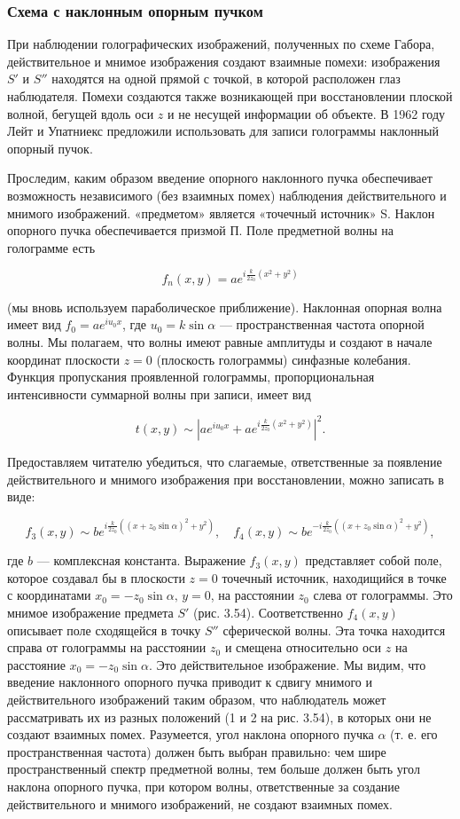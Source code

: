 \documentclass[a4paper,12pt]{article}
\begin{document}
\subsubsection{Схема с наклонным опорным пучком}

При наблюдении голографических изображений, полученных по схеме Габора, действительное и мнимое изображения создают взаимные помехи: изображения \( S' \) и \( S'' \) находятся на одной прямой с точкой, в которой расположен глаз наблюдателя. Помехи создаются также возникающей при восстановлении плоской волной, бегущей вдоль оси \( z \) и не несущей информации об объекте. В 1962 году Лейт и Упатниекс предложили использовать для записи голограммы наклонный опорный пучок.

Проследим, каким образом введение опорного наклонного пучка обеспечивает возможность независимого (без взаимных помех) наблюдения действительного и мнимого изображений. «предметом» является «точечный источник» S. Наклон опорного пучка обеспечивается призмой П. Поле предметной волны на голограмме есть

\[ f_n(x,y) = ae^{i\frac{k}{2z_0}(x^2+y^2)} \]

(мы вновь используем параболическое приближение). Наклонная опорная волна имеет вид \( f_0 = ae^{iu_0 x} \), где \( u_0 = k \sin \alpha \) — пространственная частота опорной волны. Мы полагаем, что волны имеют равные амплитуды и создают в начале координат плоскости \( z = 0 \) (плоскость голограммы) синфазные колебания. Функция пропускания проявленной голограммы, пропорциональная интенсивности суммарной волны при записи, имеет вид

\[ t(x,y) \sim \left| ae^{iu_0 x} + ae^{i\frac{k}{2z_0}(x^2+y^2)} \right|^2. \]

Предоставляем читателю убедиться, что слагаемые, ответственные за появление действительного и мнимого изображения при восстановлении, можно записать в виде:

\[ f_3(x,y) \sim be^{i\frac{k}{2z_0}((x+z_0 \sin \alpha)^2+y^2)}, \quad f_4(x,y) \sim be^{-i\frac{k}{2z_0}((x+z_0 \sin \alpha)^2+y^2)}, \]

где \( b \) — комплексная константа. Выражение \( f_3(x,y) \) представляет собой поле, которое создавал бы в плоскости \( z = 0 \) точечный источник, находищийся в точке с координатами \( x_0 = -z_0 \sin \alpha, \, y = 0 \), на расстоянии \( z_0 \) слева от голограммы. Это мнимое изображение предмета \( S' \) (рис. 3.54). Соответственно \( f_4(x,y) \) описывает поле сходящейся в точку \( S'' \) сферической волны. Эта точка находится справа от голограммы на расстоянии \( z_0 \) и смещена относительно оси \( z \) на расстояние \( x_0 = -z_0 \sin \alpha \). Это действительное изображение. Мы видим, что введение наклонного опорного пучка приводит к сдвигу мнимого и действительного изображений таким образом, что наблюдатель может рассматривать их из разных положений (1 и 2 на рис. 3.54), в которых они не создают взаимных помех. Разумеется, угол наклона опорного пучка \( \alpha \) (т. е. его пространственная частота) должен быть выбран правильно: чем шире пространственный спектр предметной волны, тем больше должен быть угол наклона опорного пучка, при котором волны, ответственные за создание действительного и мнимого изображений, не создают взаимных помех.
\end{document}
